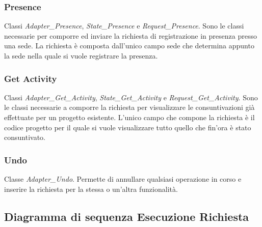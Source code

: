 \subsubsection{Presence} Classi \textit{Adapter\_Presence}, \textit{State\_Presence} e \textit{Request\_Presence}. Sono le classi necessarie per comporre ed inviare la richiesta di registrazione in presenza presso una sede. La richiesta è composta dall'unico campo sede che determina appunto la sede nella quale si vuole registrare la presenza.
\subsubsection{Get Activity} Classi \textit{Adapter\_Get\_Activity}, \textit{State\_Get\_Activity} e \textit{Request\_Get\_Activity}. Sono le classi necessarie a comporre la richiesta per visualizzare le consuntivazioni già effettuate per un progetto esistente. L'unico campo che compone la richiesta è il codice progetto per il quale si vuole visualizzare tutto quello che fin'ora è stato consuntivato.
\subsubsection{Undo} Classe \textit{Adapter\_Undo}. Permette di annullare qualsiasi operazione in corso e inserire la richiesta per la stessa o un'altra funzionalità.
\subsection{Diagramma di sequenza Esecuzione Richiesta}
\newpage

